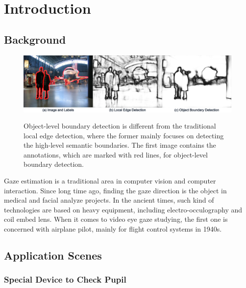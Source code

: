 \documentclass[senior]{IPSstyle}
\begin{document}
 \makepreliminarypages
 \singlespace
 \frontmatter
 \tableofcontents
 \listoffigures
 \listoftables
 \mainmatter
 \clearemptydoublepage
 \setlength{\baselineskip}{23.0pt}

\chapter{Introduction} \label{introduction}



\section{Background}

\begin{figure}[t]
  \centering
  \includegraphics[width=15cm]{object_boundary_vs_local_edge.png}\\
  \caption{Object-level boundary detection is different from the traditional local edge detection, where the former mainly focuses on detecting the high-level semantic boundaries. The first image contains the annotations, which are marked with red lines, for object-level boundary detection.}\label{object_boundary_vs_local_edge}
\end{figure}
% 
Gaze estimation is a traditional area in computer vision and computer interaction. Since long time ago, finding the gaze direction is the object in medical and facial analyze projects. In the ancient times, such kind of technologies are based on heavy equipment, including electro-occulography and coil embed lens. When it comes to video eye gaze studying, the first one is concerned with airplane pilot, mainly for flight control systems in 1940s\cite{mohamed2007history}.



\section{Application Scenes}

\subsection{Special Device to Check Pupil}
\end{document}
